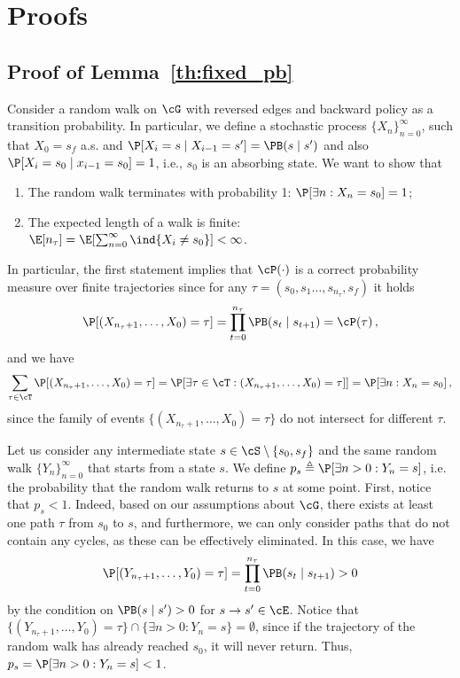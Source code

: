 \section{Proofs}\label{app:proofs}


\subsection{Proof of Lemma~\ref{th:fixed_pb}}\label{app:pb_proof}

Consider a random walk on $\cG$ with reversed edges and backward policy as a transition probability. In particular, we define a stochastic process $\{X_n\}_{n=0}^\infty$, such that $X_0 = s_f$ a.s. and $\P[X_i = s \mid X_{i-1} = s'] = \PB(s \mid s')$ and also $\P[X_i = s_0 \mid x_{i-1} = s_0] = 1$, i.e., $s_0$ is an absorbing state. We want to show that
\begin{enumerate}
    \item The random walk terminates with probability 1: $\P[\exists n : X_n = s_0 ] = 1$;
    \item The expected length of a walk is finite: $\E[n_{\tau}] = \E[\sum_{n=0}^{\infty} \ind\{X_i \not = s_0 \}] < \infty$.
\end{enumerate}
In particular, the first statement implies that $\cP(\cdot)$ is a correct probability measure over finite trajectories since for any $\tau = (s_0,s_1\ldots,s_{n_{\tau}}, s_f)$ it holds
\[
    \P[(X_{n_{\tau}+1},\ldots,X_{0}) = \tau] = \prod_{t=0}^{n_\tau} \PB(s_{t} \mid s_{t+1}) = \cP(\tau)\,,
\]
and we have
\[
    \sum_{\tau \in \cT} \P[(X_{n_{\tau}+1},\ldots,X_{0}) = \tau] = \P[\exists \tau \in \cT:  (X_{n_{\tau}+1},\ldots,X_{0}) = \tau] ] = \P[\exists n: X_n = s_0]\,,
\]
since the family of events $\{(X_{n_{\tau}+1},\ldots,X_{0}) = \tau\}$ do not intersect for different $\tau$.

Let us consider any intermediate state $s \in \cS \setminus \{s_0, s_f\}$ and the same random walk $\{Y_n\}_{n=0}^\infty$ that starts from a state $s$. We define $p_s \triangleq \P[\exists n > 0: Y_n = s]$, i.e. the probability that the random walk returns to $s$ at some point. First, notice that $p_s < 1$. Indeed, based on our assumptions about $\cG$, there exists at least one path $\tau$ from $s_0$ to $s$, and furthermore, we can only consider paths that do not contain any cycles, as these can be effectively eliminated. In this case, we have
\[
    \P[(Y_{n_{\tau}+1},\ldots,Y_{0}) = \tau] = \prod_{t=0}^{n_\tau} \PB(s_{t} \mid s_{t+1}) > 0
\]
by the condition on $\PB(s \mid s') > 0$ for $s \to s' \in \cE$. Notice that $\{ (Y_{n_{\tau}+1},\ldots,Y_{0}) = \tau\} \cap \{ \exists n > 0: Y_n = s\} = \emptyset$, since if the trajectory of the random walk has already reached $s_0$, it will never return. Thus, $p_s = \P[\exists n > 0: Y_n = s] < 1$. 

